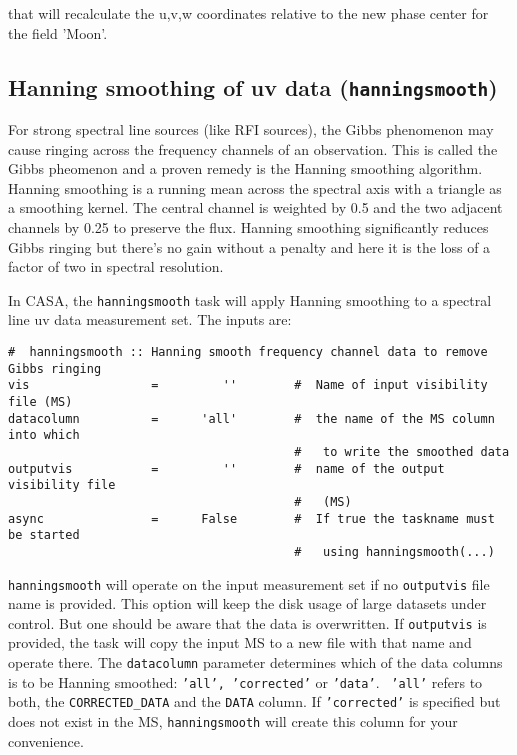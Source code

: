 that will recalculate the u,v,w coordinates relative to the new phase
center for the field 'Moon'.



\subsection{Hanning smoothing of uv data ({\tt hanningsmooth})}
\label{section:cal.other.hanningsmooth}

For strong spectral line sources (like RFI sources), the Gibbs
phenomenon may cause ringing across the frequency channels of an
observation. This is called the Gibbs pheomenon and a proven remedy is
the Hanning smoothing algorithm. Hanning smoothing is a running mean
across the spectral axis with a triangle as a smoothing kernel. The
central channel is weighted by 0.5 and the two adjacent channels by
0.25 to preserve the flux. Hanning smoothing significantly reduces
Gibbs ringing but there's no gain without a penalty and here it is the
loss of a factor of two in spectral resolution.

In CASA, the {\tt hanningsmooth} task will apply Hanning smoothing to a
spectral line uv data measurement set.  The inputs are:

\small
\begin{verbatim}
#  hanningsmooth :: Hanning smooth frequency channel data to remove Gibbs ringing
vis                 =         ''        #  Name of input visibility file (MS)
datacolumn          =      'all'        #  the name of the MS column into which
                                        #   to write the smoothed data
outputvis           =         ''        #  name of the output visibility file
                                        #   (MS)
async               =      False        #  If true the taskname must be started
                                        #   using hanningsmooth(...)
\end{verbatim}
\normalsize

{\tt hanningsmooth} will operate on the input measurement set if no
{\tt outputvis} file name is provided. This option will keep the disk
usage of large datasets under control. But one should be aware that
the data is overwritten. If {\tt outputvis} is provided, the task will
copy the input MS to a new file with that name and operate there. The
{\tt datacolumn} parameter determines which of the data columns is to
be Hanning smoothed: {\tt 'all', 'corrected'} or {\tt 'data'}. {\tt
  'all'} refers to both, the {\tt CORRECTED\_DATA} and the {\tt DATA}
column. If {\tt 'corrected'} is specified but does not exist in the
MS, {\tt hanningsmooth} will create this column for your convenience.

